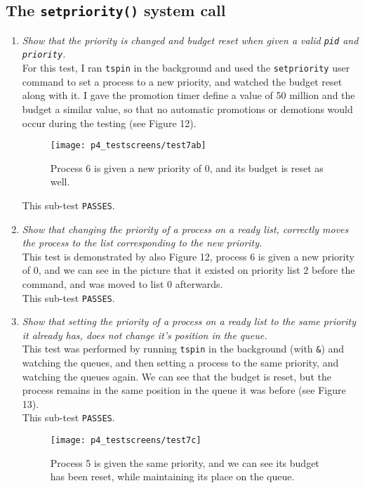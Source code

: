 \documentclass[11pt,letterpaper]{report}
\begin{document}
	\subsection{The {\tt setpriority()} system call}
	
	\begin{enumerate}
		\item \emph{Show that the priority is changed and budget reset when given a valid {\tt pid} and {\tt priority}.}\\
		For this test, I ran {\tt tspin} in the background and used the {\tt setpriority} user command to set a process to a new priority, and watched the budget reset along with it. I gave the promotion timer define a value of 50 million and the budget a similar value, so that no automatic promotions or demotions would occur during the testing (see {\color{red} Figure 12}).\\
		\begin{figure}
			\centering
			\texttt{[image: p4\_testscreens/test7ab]}
			\caption{Process 6 is given a new priority of 0, and its budget is reset as well.}
			\label{fig:test7a}
		\end{figure}
		This sub-test {\tt PASSES}.
		
		\item \emph{Show that changing the priority of a process on a ready list, correctly moves the process to the list corresponding to the new priority.}\\
		This test is demonstrated by also {\color{red} Figure 12}, process 6 is given a new priority of 0, and we can see in the picture that it existed on priority list 2 before the command, and was moved to list 0 afterwards.\\
		This sub-test {\tt PASSES}.
		
		\item \emph{Show that setting the priority of a process on a ready list to the same priority it already has, does not change it's position in the queue.}\\
		This test was performed by running {\tt tspin} in the background (with {\tt \&}) and watching the queues, and then setting a process to the same priority, and watching the queues again. We can see that the budget is reset, but the process remains in the same position in the queue it was before (see {\color{red} Figure 13}).\\
		This sub-test {\tt PASSES}.
		\begin{figure}
			\centering
			\texttt{[image: p4\_testscreens/test7c]}
			\caption{Process 5 is given the same priority, and we can see its budget has been reset, while maintaining its place on the queue.}
			\label{fig:test7c}
		\end{figure}
	

\end{enumerate}
\end{document}
